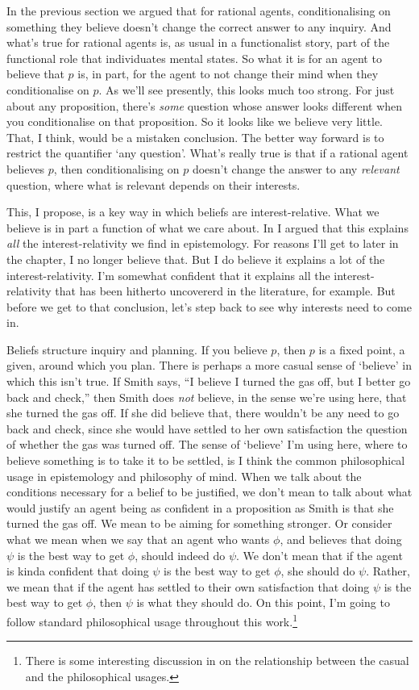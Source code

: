 In the previous section we argued that for rational agents, conditionalising on something they believe doesn't change the correct answer to any inquiry. And what's true for rational agents is, as usual in a functionalist story, part of the functional role that individuates mental states. So what it is for an agent to believe that \(p\) is, in part, for the agent to not change their mind when they conditionalise on \(p\). As we'll see presently, this looks much too strong. For just about any proposition, there's \textit{some} question whose answer looks different when you conditionalise on that proposition. So it looks like we believe very little. That, I think, would be a mistaken conclusion. The better way forward is to restrict the quantifier `any question'. What's really true is that if a rational agent believes \(p\), then conditionalising on \(p\) doesn't change the answer to any \textit{relevant} question, where what is relevant depends on their interests.

This, I propose, is a key way in which beliefs are interest-relative. What we believe is in part a function of what we care about. In \cite{Weatherson2005-WEACWD} I argued that this explains \textit{all} the interest-relativity we find in epistemology. For reasons I'll get to later in the chapter, I no longer believe that. But I do believe it explains a lot of the interest-relativity. I'm somewhat confident that it explains all the interest-relativity that has been hitherto uncovererd in the literature, for example. But before we get to that conclusion, let's step back to see why interests need to come in.

Beliefs structure inquiry and planning. If you believe \(p\), then \(p\) is a fixed point, a given, around which you plan. There is perhaps a more casual sense of `believe' in which this isn't true. If Smith says, ``I believe I turned the gas off, but I better go back and check,'' then Smith does \textit{not} believe, in the sense we're using here, that she turned the gas off. If she did believe that, there wouldn't be any need to go back and check, since she would have settled to her own satisfaction the question of whether the gas was turned off. The sense of `believe' I'm using here, where to believe something is to take it to be settled, is I think the common philosophical usage in epistemology and philosophy of mind. When we talk about the conditions necessary for a belief to be justified, we don't mean to talk about what would justify an agent being as confident in a proposition as Smith is that she turned the gas off. We mean to be aiming for something stronger. Or consider what we mean when we say that an agent who wants \(\phi\), and believes that doing \(\psi\) is the best way to get \(\phi\), should indeed do \(\psi\). We don't mean that if the agent is kinda confident that doing \(\psi\) is the best way to get \(\phi\), she should do \(\psi\). Rather, we mean that if the agent has settled to their own satisfaction that doing \(\psi\) is the best way to get \(\phi\), then \(\psi\) is what they should do. On this point, I'm going to follow standard philosophical usage throughout this work.\footnote{There is some interesting discussion in \cite[??]{FantlMcGrath2009} on the relationship between the casual and the philosophical usages.}

